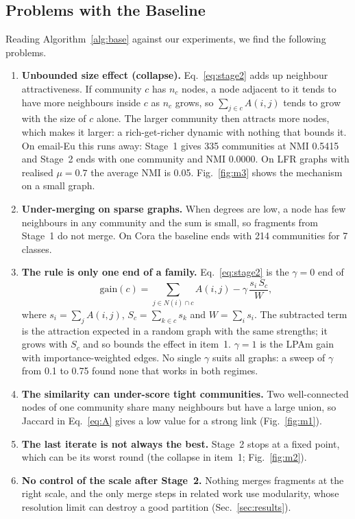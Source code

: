 \documentclass[conference]{IEEEtran}
\begin{document}
\subsection{Problems with the Baseline}\label{sec:problem}
Reading Algorithm~\ref{alg:base} against our experiments, we find the following problems.
\begin{enumerate}
\item \textbf{Unbounded size effect (collapse).} Eq.~\eqref{eq:stage2} adds up neighbour attractiveness. If community $c$ has $n_c$ nodes, a node adjacent to it tends to have more neighbours inside $c$ as $n_c$ grows, so $\sum_{j\in c}A(i,j)$ tends to grow with the size of $c$ alone. The larger community then attracts more nodes, which makes it larger: a rich-get-richer dynamic with nothing that bounds it. On email-Eu this runs away: Stage~1 gives 335 communities at NMI 0.5415 and Stage~2 ends with one community and NMI 0.0000. On LFR graphs with realised $\mu=0.7$ the average NMI is 0.05. Fig.~\ref{fig:m3} shows the mechanism on a small graph.
\item \textbf{Under-merging on sparse graphs.} When degrees are low, a node has few neighbours in any community and the sum is small, so fragments from Stage~1 do not merge. On Cora the baseline ends with 214 communities for 7 classes.
\item \textbf{The rule is only one end of a family.} Eq.~\eqref{eq:stage2} is the $\gamma=0$ end of
\begin{equation}
\mathrm{gain}(c)=\sum_{j\in N(i)\cap c}A(i,j)-\gamma\,\frac{s_i\,S_c}{W},\label{eq:gain}
\end{equation}
where $s_i=\sum_jA(i,j)$, $S_c=\sum_{k\in c}s_k$ and $W=\sum_is_i$. The subtracted term is the attraction expected in a random graph with the same strengths; it grows with $S_c$ and so bounds the effect in item~1. $\gamma=1$ is the LPAm gain~\cite{barber2009} with importance-weighted edges. No single $\gamma$ suits all graphs: a sweep of $\gamma$ from 0.1 to 0.75 found none that works in both regimes.
\item \textbf{The similarity can under-score tight communities.} Two well-connected nodes of one community share many neighbours but have a large union, so Jaccard in Eq.~\eqref{eq:A} gives a low value for a strong link (Fig.~\ref{fig:m1}).
\item \textbf{The last iterate is not always the best.} Stage~2 stops at a fixed point, which can be its worst round (the collapse in item~1; Fig.~\ref{fig:m2}).
\item \textbf{No control of the scale after Stage~2.} Nothing merges fragments at the right scale, and the only merge steps in related work use modularity, whose resolution limit can destroy a good partition (Sec.~\ref{sec:results}).

\end{enumerate}
\end{document}
